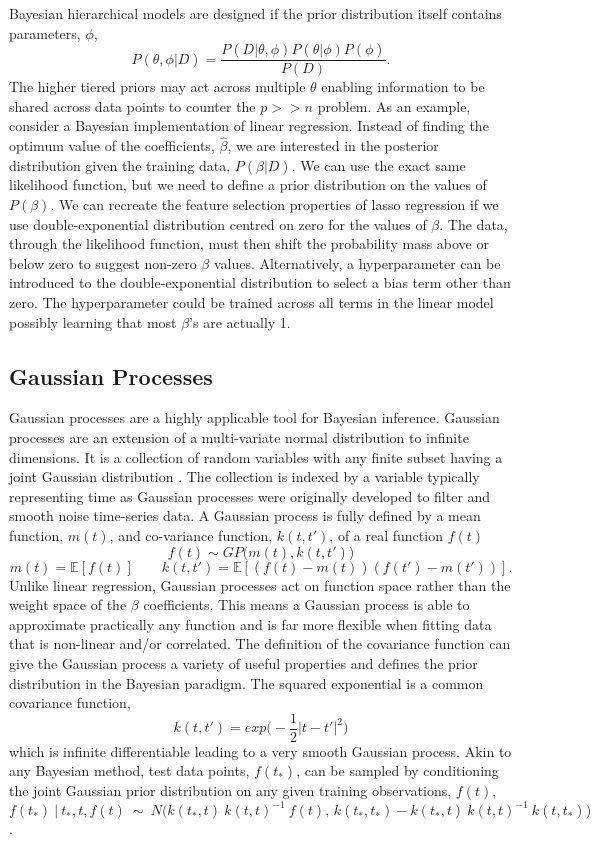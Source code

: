 \documentclass[../main.tex]{subfiles}
\begin{document}
Bayesian hierarchical models are designed if the prior distribution itself contains parameters, $\phi$, 
$$P(\theta, \phi|D) = \frac{P(D|\theta,\phi)P(\theta|\phi)P(\phi)}{P(D)}.$$
The higher tiered priors may act across multiple $\theta$ enabling information to be shared across data points to counter the $p >> n$ problem.
As an example, consider a Bayesian implementation of linear regression.
Instead of finding the optimum value of the coefficients, $\hat{\beta}$, we are interested in the posterior distribution given the training data, $P(\beta|D)$.
We can use the exact same likelihood function, but we need to define a prior distribution on the values of $P(\beta)$.
We can recreate the feature selection properties of lasso regression if we use double-exponential distribution centred on zero for the values of $\beta$.
The data, through the likelihood function, must then shift the probability mass above or below zero to suggest non-zero $\beta$ values.
Alternatively, a hyperparameter can be introduced to the double-exponential distribution to select a bias term other than zero.
The hyperparameter could be trained across all terms in the linear model possibly learning that most $\beta$'s are actually 1.

\subsection{Gaussian Processes}

Gaussian processes are a highly applicable tool for Bayesian inference.
Gaussian processes are an extension of a multi-variate normal distribution to infinite dimensions.
It is a collection of random variables with any finite subset having a joint Gaussian distribution \parencite{Rasmussen2005}.
The collection is indexed by a variable typically representing time as Gaussian processes were originally developed to filter and smooth noise time-series data. 
A Gaussian process is fully defined by a mean function, $m(t)$, and co-variance function, $k(t,t')$, of a real function $f(t)$
$$f(t)\sim GP\big(m(t),k(t,t')\big)$$
$$m(t) = \mathbb{E}[f(t)] \qquad k(t,t') = \mathbb{E}[(f(t) - m(t))(f(t') - m(t'))].$$
Unlike linear regression, Gaussian processes act on function space rather than the weight space of the $\beta$ coefficients. 
This means a Gaussian process is able to approximate practically any function and is far more flexible when fitting data that is non-linear and/or correlated.
The definition of the covariance function can give the Gaussian process a variety of useful properties and defines the prior distribution in the Bayesian paradigm.
The squared exponential is a common covariance function,
$$k(t,t') = exp\big(-\frac{1}{2}|t - t'|^2\big)$$
which is infinite differentiable leading to a very smooth Gaussian process.
Akin to any Bayesian method, test data points, $f(t_{*})$, can be sampled by conditioning the joint Gaussian prior distribution on any given training observations, $f(t)$,
$$f(t_{*})\ |\ t_{*},t,f(t)\ \sim\ N\Big(k(t_{*},t)\ k(t,t)^{-1}\ f(t),\, k(t_{*},t_{*})-k(t_{*},t)\ k(t,t)^{-1}\ k(t,t_{*})\Big)$$.
\end{document}

